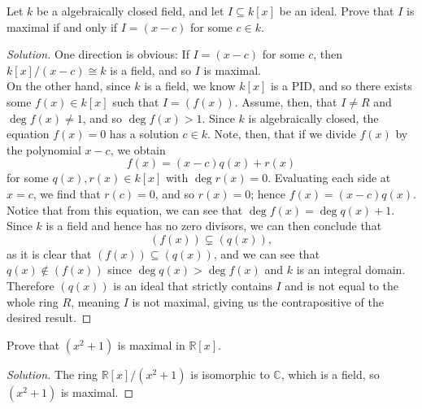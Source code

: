 \documentclass[12pt]{article}
\newenvironment{problem}[2][Problem]{\begin{trivlist}
\item[\hskip \labelsep {\bfseries #1}\hskip \labelsep {\bfseries #2.}]}{\end{trivlist}}
\newenvironment{solution}
  {\renewcommand\qedsymbol{$\blacksquare$}\begin{proof}[Solution]}
{\end{proof}}
\theoremstyle{remark}
\begin{document}
\begin{problem}{4.21}
  Let $k$ be a algebraically closed field, and let $I\subseteq k[x]$ be an 
  ideal.
  Prove that $I$ is maximal if and only if $I=(x-c)$ for some $c\in k$.
\end{problem}
\begin{solution}
  One direction is obvious: If $I=(x-c)$ for some $c$, 
  then $k[x]/(x-c)\cong k$ is a field, and so $I$ is maximal. \\
  \indent On the other hand, since $k$ is a field, we know $k[x]$ is a PID,
  and so there exists some $f(x)\in k[x]$ such that $I=(f(x))$.
  Assume, then, that $I\neq R$ and $\deg f(x)\neq1$, and so $\deg f(x) > 1$.
  Since $k$ is algebraically closed, the equation $f(x) = 0$ has a solution
  $c\in k$.
  Note, then, that if we divide $f(x)$ by the polynomial $x-c$, we obtain
  $$f(x) = (x-c)q(x) + r(x)$$ for some $q(x), r(x)\in k[x]$ with $\deg r(x) = 0$.
  Evaluating each side at $x=c$, we find that $r(c) = 0$, and so $r(x) = 0$;
  hence $f(x) = (x-c)q(x)$. \\
  \indent Notice that from this equation, we can see that $\deg f(x) = \deg q(x) + 1$.
  Since $k$ is a field and hence has no zero divisors, we can then conclude that 
  $$(f(x))\subsetneq (q(x)),$$
  as it is clear that $(f(x))\subseteq (q(x))$, and we can see that $q(x)\notin(f(x))$
  since $\deg q(x) > \deg f(x)$ and $k$ is an integral domain.
  Therefore $(q(x))$ is an ideal that strictly contains $I$ and is not equal to the whole
  ring $R$, meaning $I$ is not maximal, giving us the contrapositive of the desired result.
\end{solution}

\begin{problem}{4.22}
  Prove that $(x^2+1)$ is maximal in $\mathbb{R}[x]$.
\end{problem}
\begin{solution}
  The ring $\mathbb{R}[x]/(x^2+1)$ is isomorphic to $\mathbb{C}$,
  which is a field, so $(x^2+1)$ is maximal.
\end{solution}
\end{document}
